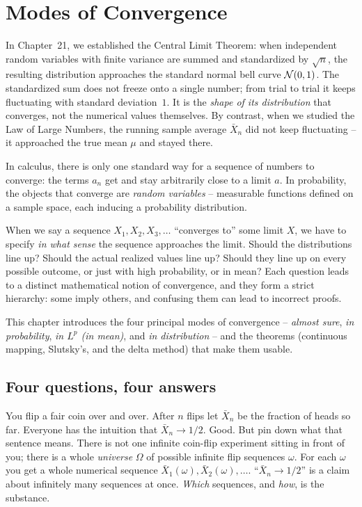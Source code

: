 \chapter{Modes of Convergence}

In Chapter~21, we established the Central Limit Theorem:
when independent random variables with finite variance are summed and standardized by
$\sqrt n$, the resulting distribution approaches the standard normal bell curve
$\mathcal{N}(0,1)$. The standardized sum does not freeze onto a single number; from trial to trial it
keeps fluctuating with standard deviation~$1$. It is the \emph{shape of
its distribution} that converges, not the numerical values themselves. By contrast, when
we studied the Law of Large Numbers, the running sample average $\bar X_n$ did
not keep fluctuating -- it approached the true mean $\mu$ and
stayed there.

In calculus, there is only one standard way for a sequence of numbers to converge: the
terms $a_n$ get and stay arbitrarily close to a limit $a$. In probability,
the objects that converge are \emph{random variables} -- measurable functions
defined on a sample space, each inducing a probability distribution.

When we say a sequence $X_1, X_2, X_3, \dots$ ``converges to'' some limit $X$,
we have to specify \emph{in what sense} the sequence approaches the limit.
Should the distributions line up? Should the actual realized values line up?
Should they line up on every possible outcome, or just with high probability, or
in mean? Each question leads to a distinct mathematical notion of convergence, and
they form a strict hierarchy: some imply others, and confusing
them can lead to incorrect proofs.

This chapter introduces the four principal modes of convergence
-- \emph{almost sure}, \emph{in probability}, \emph{in $L^p$ (in mean)},
and \emph{in distribution} -- and the theorems (continuous mapping, Slutsky's, and the delta method) that make them usable.

\chapterline

\section{Four questions, four answers}
\label{ch22:four}

\begin{intuitionbox}
You flip a fair coin over and over. After $n$ flips let $\bar X_n$ be the fraction of
heads so far. Everyone has the intuition that $\bar X_n \to 1/2$. Good. But pin down
what that sentence means. There is not one infinite coin-flip experiment sitting in
front of you; there is a whole \emph{universe} $\Omega$ of possible infinite flip
sequences $\omega$. For each $\omega$ you get a whole numerical sequence
$\bar X_1(\omega), \bar X_2(\omega), \dots$. ``$\bar X_n \to 1/2$'' is a claim about
infinitely many sequences at once. \emph{Which} sequences, and \emph{how}, is the
substance.
\end{intuitionbox}


